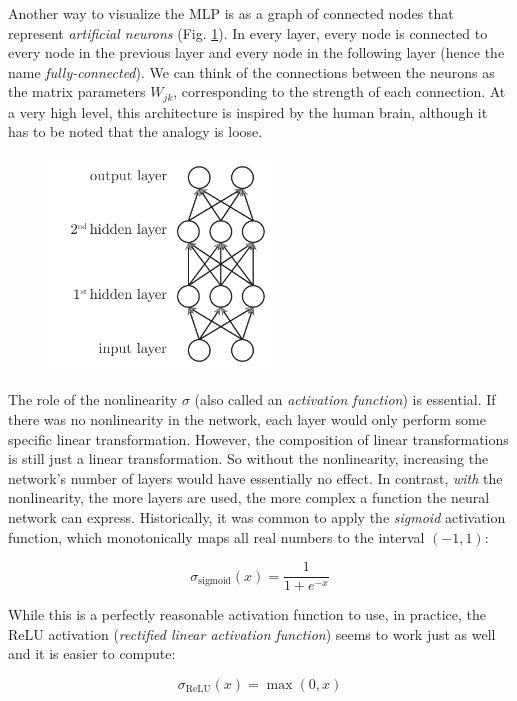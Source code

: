 \documentclass[12pt]{article}
\begin{document}
Another way to visualize the MLP is as a graph of connected nodes that represent \textit{artificial neurons} (Fig. \ref{fig_mlp}). In every layer, every node is connected to every node in the previous layer and every node in the following layer (hence the name \textit{fully-connected}). We can think of the connections between the neurons as the matrix parameters $W_{jk}$, corresponding to the strength of each connection. At a very high level, this architecture is inspired by the human brain, although it has to be noted that the analogy is loose.

\begin{figure}[H]
\centering
\includegraphics[width=6cm]{illustrations/mlp.pdf}
\caption{}
\label{fig_mlp}
\end{figure}

The role of the nonlinearity $\sigma$ (also called an \textit{activation function}) is essential. If there was no nonlinearity in the network, each layer would only perform some specific linear transformation. However, the composition of linear transformations is still just a linear transformation. So without the nonlinearity, increasing the network's number of layers would have essentially no effect. In contrast, \textit{with} the nonlinearity, the more layers are used, the more complex a function the neural network can express. Historically, it was common to apply the \textit{sigmoid} activation function, which monotonically maps all real numbers to the interval $(-1, 1)$:

\begin{equation}
\sigma_{\textrm{sigmoid}}(x) = \frac{1}{1 + e^{-x}}
\end{equation}

While this is a perfectly reasonable activation function to use, in practice, the ReLU activation (\textit{rectified linear activation function}) seems to work just as well and it is easier to compute:

\begin{equation}
\sigma_{\textrm{ReLU}}(x) = \max(0, x)
\end{equation}
\end{document}

